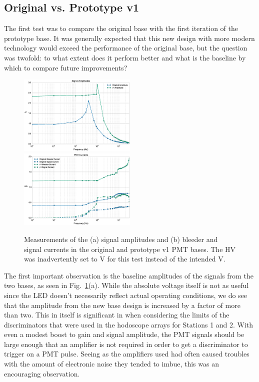 \subsection{Original vs. Prototype v1}

The first test was to compare the original base with the first iteration of the prototype base. It was generally expected that this new design with more modern technology would exceed the performance of the original base, but the question was twofold: to what extent does it perform better and what is the baseline by which to compare future improvements? 

\begin{figure}[ht]
	\centerline{
		\mbox{\includegraphics[width=0.5\textwidth]{figures/Test_v1_Amp.eps} \includegraphics[width=0.5\textwidth]{figures/Test_v1_Current.eps}}}
	\caption{Measurements of the (a) signal amplitudes and (b) bleeder and signal currents in the original and prototype v1 PMT bases. The HV was inadvertently set to \unit[-1600V]{V} for this test instead of the intended \unit[-1500]{V}.}
	\label{fig:test-v1}
\end{figure}

The first important observation is the baseline amplitudes of the signals from the two bases, as seen in Fig.~\ref{fig:test-v1}(a). While the absolute voltage itself is not as useful since the LED doesn't necessarily reflect actual operating conditions, we do see that the amplitude from the new base design is increased by a factor of more than two. This in itself is significant in when considering the limits of the discriminators that were used in the hodoscope arrays for Stations 1 and 2. With even a modest boost to gain and signal amplitude, the PMT signals should be large enough that an amplifier is not required in order to get a discriminator to trigger on a PMT pulse. Seeing as the amplifiers used had often caused troubles with the amount of electronic noise they tended to imbue, this was an encouraging observation.

